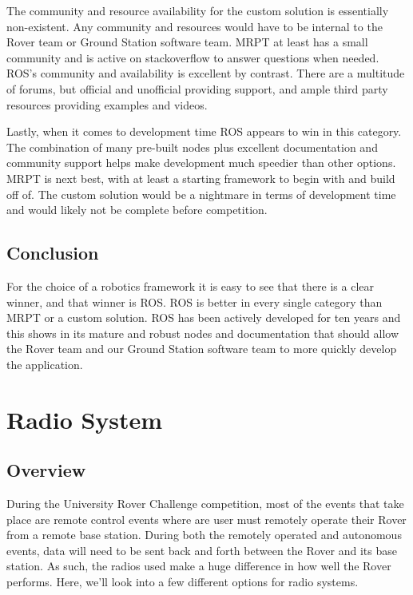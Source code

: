 \documentclass[onecolumn, draftclsnofoot, 10pt, compsoc]{IEEEtran}
\begin{document}
The community and resource availability for the custom solution is essentially non-existent. Any community and resources would have to be internal to the Rover team or Ground Station software team. MRPT at least has a small community and is active on stackoverflow to answer questions when needed. ROS's community and availability is excellent by contrast. There are a multitude of forums, but official and unofficial providing support, and ample third party resources providing examples and videos.

Lastly, when it comes to development time ROS appears to win in this category. The combination of many pre-built nodes plus excellent documentation and community support helps make development much speedier than other options. MRPT is next best, with at least a starting framework to begin with and build off of. The custom solution would be a nightmare in terms of development time and would likely not be complete before competition.

\subsection{Conclusion}
For the choice of a robotics framework it is easy to see that there is a clear winner, and that winner is ROS. 
ROS is better in every single category than MRPT or a custom solution.
ROS has been actively developed for ten years and this shows in its mature and robust nodes and documentation that should allow the Rover team and our Ground Station software team to more quickly develop the application.

\section{Radio System}
\subsection{Overview}
During the University Rover Challenge competition, most of the events that take place are remote control events where are user must remotely operate their Rover from a remote base station. During both the remotely operated and autonomous events, data will need to be sent back and forth between the Rover and its base station. As such, the radios used make a huge difference in how well the Rover performs. Here, we'll look into a few different options for radio systems.
\end{document}
